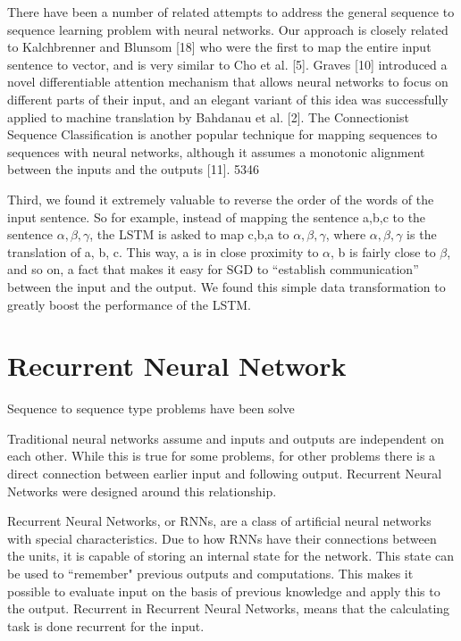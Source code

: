 There have been a number of related attempts to address the general sequence to sequence learning problem with neural networks. Our approach is closely related to Kalchbrenner and Blunsom [18] who were the first to map the entire input sentence to vector, and is very similar to Cho et al. [5]. Graves [10] introduced a novel differentiable attention mechanism that allows neural networks to focus on different parts of their input, and an elegant variant of this idea was successfully applied to machine translation by Bahdanau et al. [2]. The Connectionist Sequence Classification is another popular technique for mapping sequences to sequences with neural networks, although it assumes a monotonic alignment between the inputs and the outputs [11]. 5346

Third, we found it extremely valuable to reverse the order of the words of the input sentence. So for example, instead of mapping the sentence a,b,c to the sentence $\alpha, \beta, \gamma$, the LSTM is asked to map c,b,a to $\alpha, \beta, \gamma$, where $\alpha, \beta, \gamma$ is the translation of a, b, c. This way, a is in close proximity to $\alpha$, b is fairly close to $\beta$, and so on, a fact that makes it easy for SGD to “establish communication” between the input and the output. We found this simple data transformation to greatly boost the performance of the LSTM.


\section{Recurrent Neural Network}
Sequence to sequence type problems have been solve

Traditional neural networks assume and inputs and outputs are independent on each other. While this is true for some problems, for other problems there is a direct connection between earlier input and following output. Recurrent Neural Networks were designed around this relationship.

Recurrent Neural Networks, or RNNs, are a class of artificial neural networks with special characteristics. Due to how RNNs have their connections between the units, it is capable of storing an internal state for the network. This state can be used to ``remember" previous outputs and computations. This makes it possible to evaluate input on the basis of previous knowledge and apply this to the output. Recurrent in Recurrent Neural Networks, means that the calculating task is done recurrent for the input.

